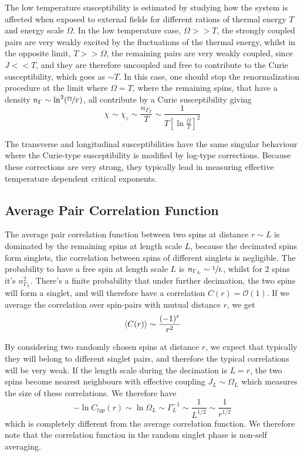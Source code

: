 \documentclass[../sdrg,../../main.tex]{subfiles}
\begin{document}
The low temperature susceptibility is estimated by studying how the system is affected when exposed to external fields for different rations of thermal energy $T$ and energy scale $\Omega$. In the low temperature case, $\Omega >> T$, the strongly coupled pairs are very weakly excited by the fluctuations of
the thermal energy, whilst in the opposite limit, $T >> \Omega$, the remaining pairs are very weakly coupled, since $J<<T$, and they are therefore uncoupled and free to contribute to the Curie susceptibility, which goes as $\sim T$. In this case, one should stop the renormalization procedure at the limit where $\Omega=T$, where the remaining spins, that have a density $n_{\Gamma}\sim \ln^{2}(\sfrac{\Omega}{T})$, all contribute by a Curie susceptibility giving
\begin{equation}
    \chi_{}\sim\chi_{z}\sim\frac{n_{\Gamma_{T}}}{T}\sim\frac{1}{T\left[\ln\frac{\Omega}{T}\right]^{2}}
\end{equation}

The transverse and longitudinal susceptibilities have the same singular behaviour where the Curie-type susceptibility is modified by log-type corrections. Because these corrections are very strong, they typically lead in measuring effective temperature dependent critical exponents.

\subsection{Average Pair Correlation Function}

The average pair correlation function between two spins at distance $r\sim L$ is dominated by the remaining spins at length scale $L$, because the decimated spins form singlets, the correlation between spins of different singlets is negligible. The probability to have a free spin at length scale $L$ is $n_{\Gamma_{L}}\sim\sfrac{1}{L}$, whilst for 2 spins it's $n_{\Gamma_{L}}^{2}$. There's a finite probability that under further decimation, the two spins will form a singlet, and will therefore have a correlation $C(r)=\mathcal{O}(1)$. If we average the correlation over spin-pairs with mutual distance $r$, we get
\begin{equation}
    \expval{C(r)}\sim \frac{(-1)^{r}}{r^{2}}
\end{equation}

By considering two randomly chosen spins at distance $r$, we expect that typically they will belong to different singlet pairs, and therefore the typical correlations will be very weak. If the length scale during the decimation is $L=r$, the two spins become nearest neighbours with effective coupling $J_{L}\sim\Omega_{L}$ which measures the size of these correlations. We therefore have
\begin{equation}
    -\ln C_{typ}(r)\sim\ln\Omega_{L}\sim\Gamma_{L}^{-1}\sim\frac{1}{L^{1/2}}\sim\frac{1}{r^{1/2}}
\end{equation}
which is completely different from the average correlation function. We therefore note that the correlation function in the random singlet phase is non-self averaging.
\end{document}
